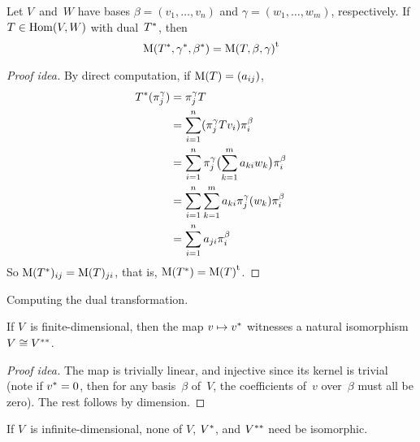 \begin{thm}
Let \(V\)~and~\(W\) have bases \(\beta=(v_1,\ldots,v_n)\) and \(\gamma=(w_1,\ldots,w_m)\), respectively. If \(T\in\operatorname{Hom}(V,W)\) with dual~\({T}^*\), then
\[\operatorname{M}({T}^*,{\gamma}^*,{\beta}^*)={\operatorname{M}(T,\beta,\gamma)}^{\mathrm{t}}\]
\end{thm}
\begin{proof}[Proof idea]
By direct computation, if \(\operatorname{M}(T)=(a_{ij})\),
\begin{align*}
{T}^*(\pi_j^{\gamma})&=\pi_j^{\gamma}T\\
	&=\sum_{i=1}^n(\pi_j^{\gamma}Tv_i)\pi_i^{\beta}\\
	&=\sum_{i=1}^n\pi_j^{\gamma}\bigl(\sum_{k=1}^m a_{ki}w_k\bigr)\pi_i^{\beta}\\
	&=\sum_{i=1}^n\sum_{k=1}^m a_{ki}\pi_j^{\gamma}(w_k)\pi_i^{\beta}\\
	&=\sum_{i=1}^n a_{ji}\pi_i^{\beta}
\end{align*}
So \(\operatorname{M}({T}^*)_{ij}=\operatorname{M}(T)_{ji}\), that is, \(\operatorname{M}({T}^*)={\operatorname{M}(T)}^{\mathrm{t}}\).
\end{proof}
\begin{app}
Computing the dual transformation.
\end{app}

\begin{thm}
If \(V\)~is finite-dimensional, then the map \(v\mapsto{v}^*\) witnesses a natural isomorphism \(V\cong{V}^{**}\).
\end{thm}
\begin{proof}[Proof idea]
The map is trivially linear, and injective since its kernel is trivial (note if \({v}^*=0\), then for any basis~\(\beta\) of~\(V\), the coefficients of~\(v\) over~\(\beta\) must all be zero). The rest follows by dimension. 
\end{proof}
\begin{rmk}
If \(V\)~is infinite-dimensional, none of \(V\), \({V}^*\), and \({V}^{**}\) need be isomorphic.
\end{rmk}